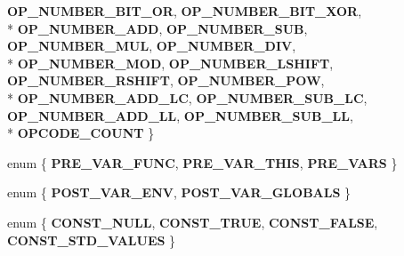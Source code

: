 \begin{DoxyCompactItemize}
{\bfseries O\+P\+\_\+\+N\+U\+M\+B\+E\+R\+\_\+\+B\+I\+T\+\_\+\+OR}, 
{\bfseries O\+P\+\_\+\+N\+U\+M\+B\+E\+R\+\_\+\+B\+I\+T\+\_\+\+X\+OR}, 
\\*
{\bfseries O\+P\+\_\+\+N\+U\+M\+B\+E\+R\+\_\+\+A\+DD}, 
{\bfseries O\+P\+\_\+\+N\+U\+M\+B\+E\+R\+\_\+\+S\+UB}, 
{\bfseries O\+P\+\_\+\+N\+U\+M\+B\+E\+R\+\_\+\+M\+UL}, 
{\bfseries O\+P\+\_\+\+N\+U\+M\+B\+E\+R\+\_\+\+D\+IV}, 
\\*
{\bfseries O\+P\+\_\+\+N\+U\+M\+B\+E\+R\+\_\+\+M\+OD}, 
{\bfseries O\+P\+\_\+\+N\+U\+M\+B\+E\+R\+\_\+\+L\+S\+H\+I\+FT}, 
{\bfseries O\+P\+\_\+\+N\+U\+M\+B\+E\+R\+\_\+\+R\+S\+H\+I\+FT}, 
{\bfseries O\+P\+\_\+\+N\+U\+M\+B\+E\+R\+\_\+\+P\+OW}, 
\\*
{\bfseries O\+P\+\_\+\+N\+U\+M\+B\+E\+R\+\_\+\+A\+D\+D\+\_\+\+LC}, 
{\bfseries O\+P\+\_\+\+N\+U\+M\+B\+E\+R\+\_\+\+S\+U\+B\+\_\+\+LC}, 
{\bfseries O\+P\+\_\+\+N\+U\+M\+B\+E\+R\+\_\+\+A\+D\+D\+\_\+\+LL}, 
{\bfseries O\+P\+\_\+\+N\+U\+M\+B\+E\+R\+\_\+\+S\+U\+B\+\_\+\+LL}, 
\\*
{\bfseries O\+P\+C\+O\+D\+E\+\_\+\+C\+O\+U\+NT}
 \}\hypertarget{class_object_script_1_1_o_s_1_1_core_a69b4a36bc0a853e6ed64a891d7498fed}{}\label{class_object_script_1_1_o_s_1_1_core_a69b4a36bc0a853e6ed64a891d7498fed}

\item 
enum \{ {\bfseries P\+R\+E\+\_\+\+V\+A\+R\+\_\+\+F\+U\+NC}, 
{\bfseries P\+R\+E\+\_\+\+V\+A\+R\+\_\+\+T\+H\+IS}, 
{\bfseries P\+R\+E\+\_\+\+V\+A\+RS}
 \}\hypertarget{class_object_script_1_1_o_s_1_1_core_ac9b295626e17161b7a6dbd52b9d30a25}{}\label{class_object_script_1_1_o_s_1_1_core_ac9b295626e17161b7a6dbd52b9d30a25}

\item 
enum \{ {\bfseries P\+O\+S\+T\+\_\+\+V\+A\+R\+\_\+\+E\+NV}, 
{\bfseries P\+O\+S\+T\+\_\+\+V\+A\+R\+\_\+\+G\+L\+O\+B\+A\+LS}
 \}\hypertarget{class_object_script_1_1_o_s_1_1_core_a66ec1c01a1aeba9b81c4a02eb62b40a6}{}\label{class_object_script_1_1_o_s_1_1_core_a66ec1c01a1aeba9b81c4a02eb62b40a6}

\item 
enum \{ {\bfseries C\+O\+N\+S\+T\+\_\+\+N\+U\+LL}, 
{\bfseries C\+O\+N\+S\+T\+\_\+\+T\+R\+UE}, 
{\bfseries C\+O\+N\+S\+T\+\_\+\+F\+A\+L\+SE}, 
{\bfseries C\+O\+N\+S\+T\+\_\+\+S\+T\+D\+\_\+\+V\+A\+L\+U\+ES}
 \}\hypertarget{class_object_script_1_1_o_s_1_1_core_a3116a9628127ca4c2fc1e1801ce8a783}{}\label{class_object_script_1_1_o_s_1_1_core_a3116a9628127ca4c2fc1e1801ce8a783}


\end{DoxyCompactItemize}
